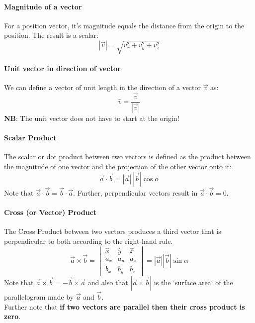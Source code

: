 \documentclass[11pt]{article}
\begin{document}
\paragraph{Magnitude of a vector}
For a position vector, it's magnitude equals the distance from the origin to the position.
The result is a scalar:
\begin{equation}
    \label{eq:equation4}
    |\vec{v}| = \sqrt {v^2_x + v^2_y + v^2_z}
\end{equation}
\paragraph{Unit vector in direction of vector}
We can define a vector of unit length in the direction of a vector $\vec{v}$ as:
    \begin{equation}
        \label{eq:equation5}
        \hat{v} = \frac{\vec{v}}{|\vec{v}|}
    \end{equation}
\textbf{NB}: The unit vector does not have to start at the origin!
\paragraph{Scalar Product}
The scalar or dot product between two vectors is defined as the product between the magnitude of one vector and the projection of the other vector onto it:\\
\begin{equation}
    \label{eq:equation6}
    \vec{a} \cdot \vec{b} = |\vec{a}|\:|\vec{b}|\cos \alpha
\end{equation}
Note that $\vec{a} \cdot \vec{b} = \vec{b} \cdot \vec{a}$.
Further, perpendicular vectors result in $\vec{a} \cdot \vec{b} = 0$.
\paragraph{Cross (or Vector) Product}
The Cross Product between two vectors produces a third vector that is perpendicular to both according to the right-hand rule.\\
\begin{equation}
    \label{eq:equation7}
    \vec{a} \times \vec{b} =
    \begin{vmatrix}
        \hat{x} & \hat{y} & \hat{x} \\
        a_x & a_y & a_z \\
        b_x & b_y & b_z
    \end{vmatrix}
    = |\vec{a}||\vec{b}|\sin \alpha
\end{equation}
Note that $\vec{a} \times \vec{b} = - \vec{b} \times \vec{a}$ and also that $| \vec{a} \times \vec{b} |$ is the
`surface area` of the parallelogram made by $\vec{a}$ and $\vec{b}$.\\
Further note that \textbf{if two vectors are parallel then their cross product is zero}.
\end{document}

